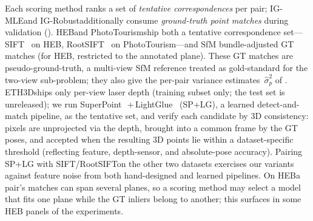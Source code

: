 \documentclass{article}
\newcommand{\mname}[1]{\texorpdfstring{#1\xspace}{#1}}
\newcommand{\igmle}{\mname{IG-MLE}}
\newcommand{\igrobust}{\mname{IG-Robust}}
\newcommand{\phototourism}{\mname{PhotoTourism}}
\newcommand{\ethd}{\mname{ETH3D}}
\newcommand{\heb}{\mname{HEB}}
\newcommand{\rootsift}{\mname{RootSIFT}}
\newcommand{\superpoint}{\mname{SuperPoint}}
\newcommand{\lightglue}{\mname{LightGlue}}
\begin{document}
Each scoring method ranks a set of \emph{tentative
	correspondences} per pair; \igmle and \igrobust additionally
consume \emph{ground-truth point matches} during validation
().  \heb and \phototourism ship both a
tentative correspondence set---SIFT~\cite{Lowe2004} on \heb,
\rootsift~\cite{Arandjelovic2012} on \phototourism---and
SfM bundle-adjusted GT matches (for \heb, restricted to the
annotated plane).  These GT matches are
pseudo-ground-truth, a multi-view SfM reference treated as
gold-standard for the two-view sub-problem; they also give the
per-pair variance estimates~$\hat\sigma^2_p$ of
.  \ethd ships only per-view laser depth (training
subset only; the test set is unreleased); we run
\superpoint~\cite{DeTone2018}\,+\,\lightglue~\cite{Lindenberger2023}
(SP+LG), a learned detect-and-match pipeline, as the
tentative set, and verify each candidate by 3D consistency:
pixels are unprojected via the depth, brought into a common
frame by the GT poses, and accepted when the resulting 3D
points lie within a dataset-specific threshold (reflecting
feature, depth-sensor, and absolute-pose accuracy).  Pairing
SP+LG with SIFT/\rootsift on the other two datasets exercises
our variants against feature noise from both hand-designed and
learned pipelines.  On \heb a pair's matches can span several
planes, so a scoring method may select a model that fits one plane
while the GT inliers belong to another; this surfaces in some \heb
panels of the experiments.

\clearpage

\end{document}
